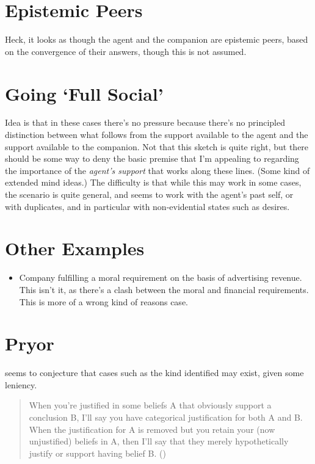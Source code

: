 \documentclass[10pt]{article}
\begin{document}
\section{Epistemic Peers}
\label{sec:epistemic-peers}

Heck, it looks as though the agent and the companion are epistemic peers, based on the convergence of their answers, though this is not assumed.

\section{Going `Full Social'}
\label{sec:going-full-social}

Idea is that in these cases there's no pressure because there's no principled distinction between what follows from the support available to the agent and the support available to the companion.
Not that this sketch is quite right, but there should be some way to deny the basic premise that I'm appealing to regarding the importance of the \emph{agent's support} that works along these lines.
(Some kind of extended mind ideas.)
The difficulty is that while this may work in some cases, the scenario is quite general, and seems to work with the agent's past self, or with duplicates, and in particular with non-evidential states such as desires.


\section{Other Examples}
\label{sec:other-examples}

\begin{itemize}
\item Company fulfilling a moral requirement on the basis of advertising revenue.
  This isn't it, as there's a clash between the moral and financial requirements.
  This is more of a wrong kind of reasons case.
\end{itemize}


\newpage

\section{Pryor}
\label{sec:pryor}

\textcite{Pryor:2018aa} seems to conjecture that cases such as the kind identified may exist, given some leniency.

\begin{quote}
  When you're justified in some beliefs A that obviously support a conclusion B, I'll say you have categorical justification for both A and B.
  When the justification for A is removed but you retain your (now unjustified) beliefs in A, then I'll say that they merely hypothetically justify or support having belief B.\nolinebreak
  \mbox{}\hfill\mbox{(\citeauthor[126]{Pryor:2018aa})}
\end{quote}
\end{document}

